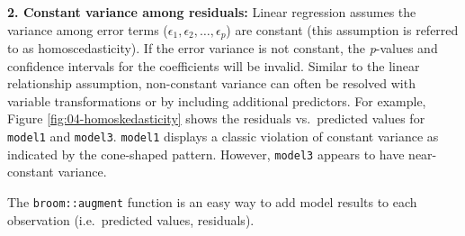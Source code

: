 \documentclass[]{krantz}
\makeatletter
\newenvironment{kframe}{%
\medskip{}
\setlength{\fboxsep}{.8em}
 \def\at@end@of@kframe{}%
 \ifinner\ifhmode%
  \def\at@end@of@kframe{\end{minipage}}%
  \begin{minipage}{\columnwidth}%
 \fi\fi%
 \def\FrameCommand##1{\hskip\@totalleftmargin \hskip-\fboxsep
 \colorbox{shadecolor}{##1}\hskip-\fboxsep
     \hskip-\linewidth \hskip-\@totalleftmargin \hskip\columnwidth}%
 \MakeFramed {\advance\hsize-\width
   \@totalleftmargin\z@ \linewidth\hsize
   \@setminipage}}%
 {\par\unskip\endMakeFramed%
 \at@end@of@kframe}
\newenvironment{block}[1]
  {
  \begin{itemize}
  \renewcommand{\labelitemi}{
    \raisebox{-.7\height}[0pt][0pt]{
      {\setkeys{Gin}{width=3em,keepaspectratio}\texttt{[image: icons/\#1]}}
    }
  }
  \setlength{\fboxsep}{1em}
  \begin{kframe}
  \item
  }
  {
  \end{kframe}
  \end{itemize}
  }
\newenvironment{tip}
  {\begin{block}{tip}}
  {\end{block}}
\makeatother
\begin{document}
\textbf{2. Constant variance among residuals:} Linear regression assumes the variance among error terms (\(\epsilon_1, \epsilon_2, \dots, \epsilon_p\)) are constant (this assumption is referred to as homoscedasticity). If the error variance is not constant, the \emph{p}-values and confidence intervals for the coefficients will be invalid. Similar to the linear relationship assumption, non-constant variance can often be resolved with variable transformations or by including additional predictors. For example, Figure \ref{fig:04-homoskedasticity} shows the residuals vs.~predicted values for \texttt{model1} and \texttt{model3}. \texttt{model1} displays a classic violation of constant variance as indicated by the cone-shaped pattern. However, \texttt{model3} appears to have near-constant variance.

\begin{tip}
The \texttt{broom::augment} function is an easy way to add model results
to each observation (i.e.~predicted values, residuals).
\end{tip}
\end{document}
